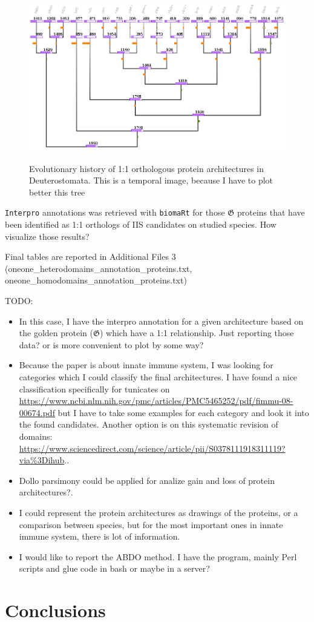\documentclass[11pt]{article}
\newcommand{\TODO}[1]{\begingroup\color{red}#1\endgroup}
\begin{document}
\begin{figure}[ht!]
\centering 
\includegraphics[scale=0.63]{figures/oneoneDollo} \\
\caption{Evolutionary history of 1:1 orthologous protein architectures in 
Deuterostomata. \TODO{This is a temporal image, because I have to plot better this tree}}\label{fig:dollooneone}
\end{figure}

\texttt{Interpro} annotations was retrieved with \texttt{biomaRt} for 
those $\boldsymbol{\mathfrak{G}}$ proteins that have been identified
as 1:1 orthologs of IIS candidates on studied species.
\TODO{How visualize those results?}

\TODO{Final tables are reported in Additional Files 3 
(oneone\_heterodomains\_annotation\_proteins.txt, 
oneone\_homodomains\_annotation\_proteins.txt)}

\TODO{TODO:}
\begin{itemize}
\item \TODO{In this case, I have the interpro annotation for a given architecture based
on the golden protein ($\boldsymbol{\mathfrak{G}}$) which have a 1:1 relationship. Just
reporting those data? or is more convenient to plot by some way?}
\item \TODO{Because the paper is about innate immune system, I was looking for 
categories which I could classify the final architectures. I have found a nice classification
specifically for tunicates on \url{https://www.ncbi.nlm.nih.gov/pmc/articles/PMC5465252/pdf/fimmu-08-00674.pdf} but I have to take some examples for each category and look it into
the found candidates. Another option is on this systematic revision of domains: \url{https://www.sciencedirect.com/science/article/pii/S0378111918311119?via\%3Dihub}.}.
\item \TODO{Dollo parsimony could be applied for analize gain and loss of protein architectures?.}
\item \TODO{I could represent the protein architectures as drawings of the proteins, or a comparison between species, but for the most important ones in innate immune system, there is lot of information.}
\item \TODO{I would like to report the ABDO method. I have the program, mainly Perl scripts and glue code in bash or maybe in a server?}
\end{itemize}

\section*{Conclusions}



\end{document}
